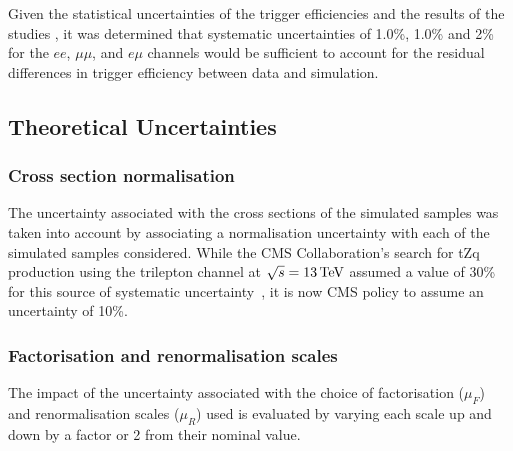 %

Given the statistical uncertainties of the trigger efficiencies and the results of the studies , it was determined that systematic uncertainties of 1.0\%, 1.0\% and 2\% for the $ee$, $\mu\mu$, and $e \mu$ channels would be sufficient to account for the residual differences in trigger efficiency between data and simulation.

\subsection{Theoretical Uncertainties}\label{sec:theorySysts}
\subsubsection{Cross section normalisation}
The uncertainty associated with the cross sections of the simulated samples was taken into account by associating a normalisation uncertainty with each of the simulated samples considered.
While the CMS Collaboration's search for tZq production using the trilepton channel at $\sqrt{s} = 13\,\text{Te\hspace{-.08em}V}$ assumed a value of 30\% for this source of systematic uncertainty~\cite{Sirunyan:2017nbr}, it is now CMS policy to assume an uncertainty of 10\%.

\subsubsection{Factorisation and renormalisation scales}
The impact of the uncertainty associated with the choice of factorisation ($\mu_{F}$) and renormalisation scales ($\mu_{R}$) used is evaluated by varying each scale up and down by a factor or 2 from their nominal value.

